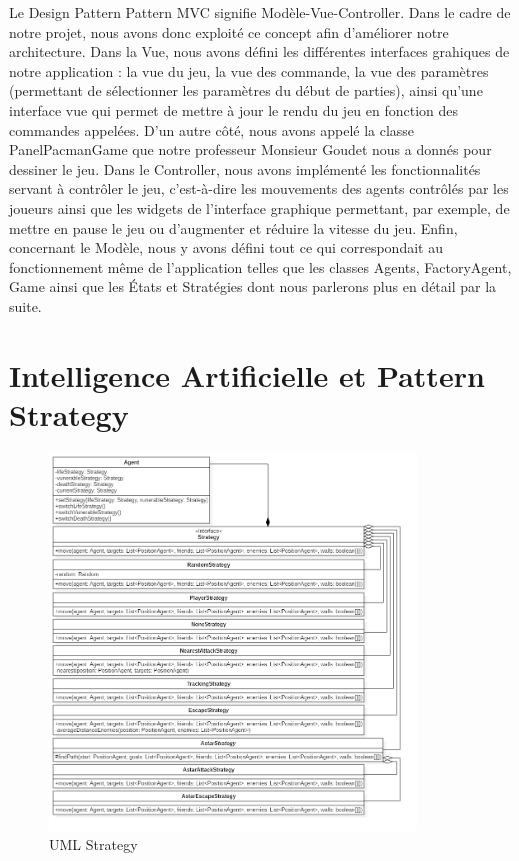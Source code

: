 \documentclass[a4paper, 11pt]{article}
\begin{document}
Le Design Pattern Pattern MVC signifie Modèle-Vue-Controller. Dans le cadre de notre projet, nous avons donc exploité ce concept afin d'améliorer
notre architecture. Dans la Vue, nous avons défini les différentes interfaces grahiques de notre application : la vue du jeu, la vue des commande, la vue des paramètres 
(permettant de sélectionner les paramètres du début de parties), ainsi qu'une interface vue qui permet de mettre à jour le rendu du jeu en fonction des commandes appelées. 
D'un autre côté, nous avons appelé la classe PanelPacmanGame que notre professeur Monsieur Goudet nous a donnés pour dessiner le jeu. Dans le Controller, nous avons implémenté les 
fonctionnalités servant à contrôler le jeu, c'est-à-dire les mouvements des agents contrôlés par les joueurs ainsi que les widgets de l'interface
graphique permettant, par exemple, de mettre en pause le jeu ou d'augmenter et réduire la vitesse du jeu. Enfin, concernant le Modèle, nous y avons
défini tout ce qui correspondait au fonctionnement même de l'application telles que les classes Agents, FactoryAgent, Game ainsi que les États et Stratégies 
dont nous parlerons plus en détail par la suite. 

\part{Intelligence Artificielle et Pattern Strategy}

\begin{figure}[H]
  \begin{center}
  \includegraphics[height=10cm]{img/png/strategy}
  \end{center}
  \caption[schema]{UML Strategy}
\end{figure}
\end{document}
